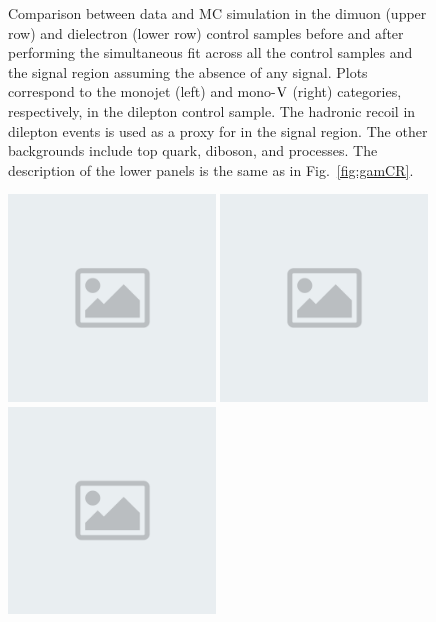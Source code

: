 \begin{figure}[hbtp]
\begin{center}
\caption{
Comparison between data and MC simulation in the  dimuon (upper row) and dielectron  (lower row)
control samples before and after
performing the simultaneous fit across all the control samples and the signal region
assuming the absence of any signal. Plots correspond to the monojet (left) and mono-$\mathrm{V}$ (right)
categories, respectively, in the dilepton control sample.
The hadronic recoil \pt in dilepton events is used as a proxy for \ptmiss in the signal region.
The other backgrounds include top quark, diboson, and \Wjets processes.
The description of the lower panels is the same as in Fig.~\ref{fig:gamCR}.
}
\label{fig:zmmCR}\end{center}\end{figure}

\begin{figure}[hbtp]\begin{center}
\includegraphics[width=0.49\textwidth]{placeholder.png}
\includegraphics[width=0.49\textwidth]{placeholder.png}
\\
\includegraphics[width=0.49\textwidth]{placeholder.png}

\end{center}
\end{figure}
